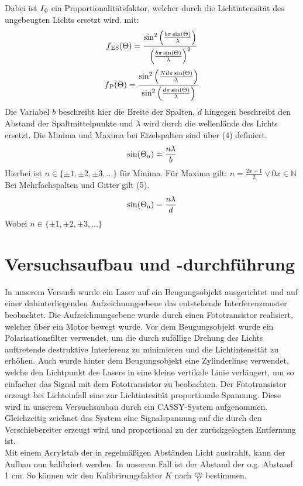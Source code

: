 \documentclass[11pt]{article}
\begin{document}
Dabei ist $I\textsubscript{0}$ ein Proportionalitätsfaktor, welcher durch die Lichtintensität des ungebeugten Lichts ersetzt wird. mit:
	\begin{equation}
	f\textsubscript{ES}(\Theta )=\frac{\sin^2\left(\frac{b\pi\sin(\Theta )}{\lambda}\right)}{\left(\frac{b\pi\sin(\Theta )}{\lambda}\right)^2}
	\end{equation}
	\begin{equation}
	f\textsubscript{P}(\Theta )=\frac{\sin^2\left(\frac{Nd\pi\sin(\Theta )}{\lambda}\right)}{\sin^2\left(\frac{d\pi\sin(\Theta )}{\lambda}\right)}
	\end{equation}
Die Variabel $b$ beschreibt hier die Breite der Spalten, $d$ hingegen beschreibt den Abstand der Spaltmittelpunkte und $\lambda$ wird durch die wellenlände des Lichts ersetzt.
Die Minima und Maxima bei Eizelspalten sind über (4) definiert.
	\begin{equation}
	\sin(\Theta\textsubscript{n})=\frac{n\lambda}{b}
	\end{equation}
Hierbei ist $n\in\{\pm 1,\pm 2,\pm 3, ...\}$ für Minima. Für Maxima gilt: $n=\frac{2x+1}{2}\lor 0$\hspace{10mm}$x\in\mathbb{N}$
Bei Mehrfachspalten und Gitter gilt (5).
	\begin{equation}
	\sin(\Theta\textsubscript{n})=\frac{n\lambda}{d}
	\end{equation}
Wobei $n\in\{\pm 1,\pm 2,\pm 3, ...\}$

\section{Versuchsaufbau und -durchführung}
In unserem Versuch wurde ein Laser auf ein Beugungsobjekt ausgerichtet und auf einer dahinterliegenden Aufzeichnungsebene das entstehende Interferenzmuster beobachtet. Die Aufzeichnungsebene wurde durch einen Fototransistor realisiert, welcher über ein Motor bewegt wurde. Vor dem Beugungsobjekt wurde ein Polarisationsfilter verwendet, um die durch zufällige Drehung des Lichts auftretende destruktive Interferenz zu minimieren und die Lichtintensität zu erhöhen. Auch wurde hinter dem Beugungsobjekt eine Zylinderlinse verwendet, welche den Lichtpunkt des Lasers in eine kleine vertikale Linie verlängert, um so einfacher das Signal mit dem Fototransistor zu beobachten. Der Fototransistor erzeugt bei Lichteinfall eine zur Lichtintesität proportionale Spannung. Diese wird in unserem Versuchsaubau durch ein CASSY-System aufgenommen. Gleichzeitig zeichnet das System eine Signalspannung auf die durch den Verschiebereiter erzeugt wird und proportional zu der zurückgelegten Entfernung ist. \\Mit einem Acrylstab der in regelmäßigen Abständen Licht austrahlt, kann der Aufbau nun kalibriert werden. In unserem Fall ist der Abstand der o.g. Abstand 1 cm. So können wir den Kalibrirungsfaktor $K$ nach $\frac{cm}{V}$ bestimmen.
\end{document}
